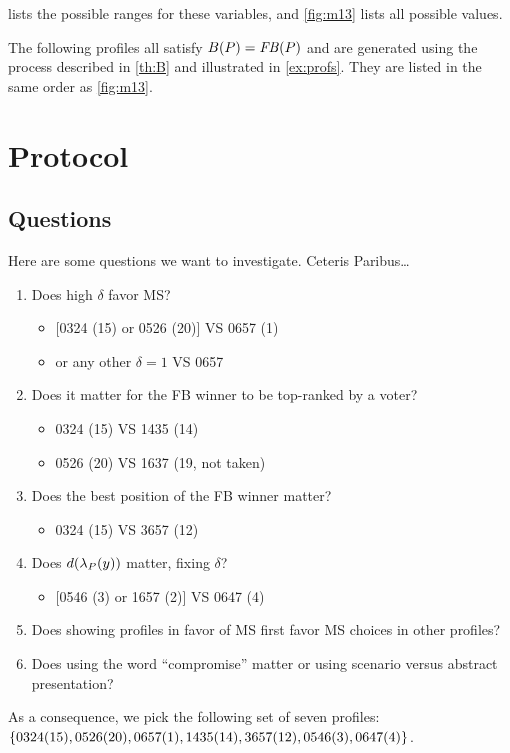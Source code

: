 \documentclass[pagesize, twoside=off, bibliography=totoc, DIV=calc, fontsize=12pt, a4paper]{scrartcl}
\begin{document}
 lists the possible ranges for these variables, and \cref{fig:m13} lists all possible values.

The following profiles all satisfy $B(P) = \mathit{FB}(P)$ and are generated using the process described in \cref{th:B} and illustrated in \cref{ex:profs}.
They are listed in the same order as \cref{fig:m13}.



\section{Protocol}
\subsection{Questions}
Here are some questions we want to investigate.
Ceteris Paribus…
\begin{enumerate}
	\item Does high $\delta$ favor MS?
	\begin{itemize}
		\item {}[0324 (15) or 0526 (20)] VS 0657 (1)
		\item or any other $\delta = 1$ VS 0657
	\end{itemize}
	\item Does it matter for the FB winner to be top-ranked by a voter? 
	\begin{itemize}
		\item 0324 (15) VS 1435 (14)
		\item 0526 (20) VS 1637 (19, not taken)
	\end{itemize}
	\item Does the best position of the FB winner matter?
	\begin{itemize}
		\item 0324 (15) VS 3657 (12)
	\end{itemize}
	\item Does $d(\lambda_P(y))$ matter, fixing $\delta$?
	\begin{itemize}
		\item{} [0546 (3) or 1657 (2)] VS 0647 (4)
	\end{itemize}
	\item Does showing profiles in favor of MS first favor MS choices in other profiles?
	\item Does using the word “compromise” matter or using scenario  versus abstract presentation?
\end{enumerate}
As a consequence, we pick the following set of seven profiles: $\{0324 (15), 0526 (20), 0657 (1), \allowbreak 1435 (14), \allowbreak 3657 (12), \allowbreak 0546 (3), 0647 (4)\}$.
\end{document}
